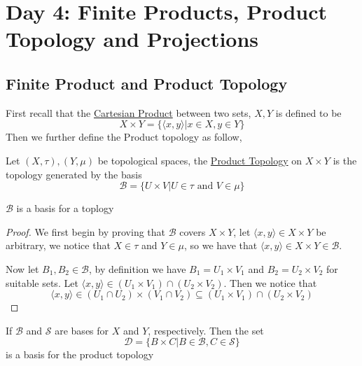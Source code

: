 \section{Day 4: Finite Products, Product Topology and Projections}
\subsection{Finite Product and Product Topology}
First recall that the \href{https://en.wikipedia.org/wiki/Cartesian_product}{Cartesian Product} between two sets, $X,Y$ is defined to be
\[X\times Y=\{\langle x,y\rangle\vert x\in X,y\in Y\}\]
Then we further define the Product topology as follow,
\begin{definition}
    Let $(X,\tau),(Y,\mu)$ be topological spaces, the \href{https://en.wikipedia.org/wiki/Product_topology}{Product Topology} on $X\times Y$ is the topology generated by the basis
    \[\mathscr{B}=\{U\times V\vert U\in\tau\text{ and } V\in\mu\}\]    
\end{definition}
\begin{proposition}
    $\mathscr{B}$ is a basis for a toplogy
\end{proposition}
\begin{proof}
    We first begin by proving that $\mathscr{B}$ covers $X\times Y$, let $\langle x,y\rangle\in X\times Y$ be arbitrary, we notice that $X\in\tau$ and $Y\in\mu$, so we have that $\langle x,y\rangle\in X\times Y\in\mathscr{B}$.

    Now let $B_1,B_2\in\mathscr{B}$, by definition we have $B_1=U_1\times V_1$ and $B_2 = U_2\times V_2$ for suitable sets. Let $\langle x,y\rangle\in(U_1\times V_1)\cap(U_2\times V_2)$. Then we notice that 
    \[\langle x,y\rangle\in(U_1\cap U_2)\times(V_1\cap V_2)\subseteq (U_1\times V_1)\cap(U_2\times V_2)\]
\end{proof}
\begin{theorem}
    If $\mathscr{B}$ and $\mathscr{S}$ are bases for $X$ and $Y$, respectively. Then the set 
    \[\mathscr{D} = \{B\times C\vert B\in\mathscr{B},C\in\mathscr{S}\}\]
    is a basis for the product topology
\end{theorem}
